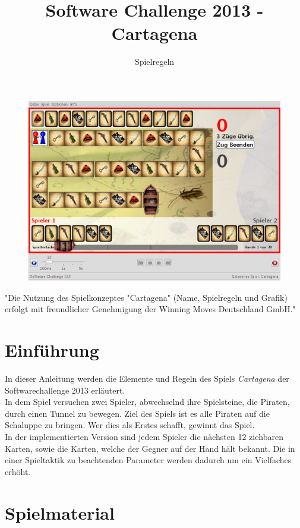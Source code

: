 \documentclass{scrartcl}
\title{Software Challenge 2013 - Cartagena}
\subtitle{Spielregeln}
\newcommand{\EmptyPlainPage}{\newpage\thispagestyle{plain}\ \newpage}
\begin{document}
\maketitle

\begin{figure}[h]
	\centering
	\includegraphics[width=\linewidth]{bilder/Uebersicht.png}
\end{figure}

"Die Nutzung des Spielkonzeptes "Cartagena" (Name, Spielregeln und Grafik)
erfolgt mit freundlicher Genehmigung der Winning Moves Deutschland GmbH."
\newpage
\tableofcontents
\EmptyPlainPage

\section{Einführung}
In dieser Anleitung werden die Elemente und Regeln des Spiels \emph{Cartagena}
der Softwarechallenge 2013 erläutert.\\
In dem Spiel versuchen zwei Spieler,
abwechselnd ihre Spielsteine, die Piraten, durch einen Tunnel zu bewegen.
Ziel des Spiels ist es alle Piraten auf die Schaluppe zu bringen. Wer dies als
Erstes schafft, gewinnt das Spiel.\\
In der implementierten Version sind jedem Spieler die nächsten 12 ziehbaren
Karten, sowie die Karten, welche der Gegner auf der Hand hält bekannt. Die
in einer Spieltaktik zu beachtenden Parameter werden dadurch um ein Vielfaches
erhöht.

\section{Spielmaterial}
\end{document}
